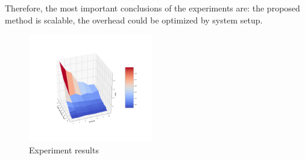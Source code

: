 Therefore, the most important conclusions of the experiments are: the proposed method is scalable, the overhead could be optimized by system setup.

\begin{figure}[htbp]
  \centering
  \includegraphics[width=0.48\textwidth]{pics/experiment}
  \caption{Experiment results}
  \label {experiment}
\end{figure}
